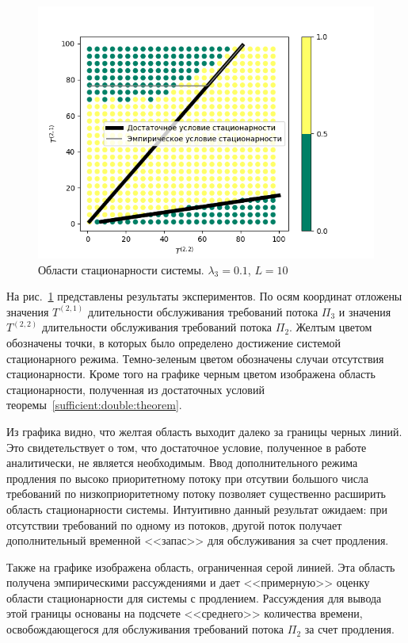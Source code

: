 \documentclass{report}
\begin{document}
\begin{figure}[h]
\centering
\includegraphics[scale=0.85]{0_1_thres_10_target_fact_.png} 
\caption{Области стационарности системы. $\lambda_3=0.1$, $L=10$}
\label{Experiment:stationar}
\end{figure}
На рис.~\ref{Experiment:stationar} представлены результаты экспериментов. По осям координат отложены значения $T^{(2,1)}$ длительности обслуживания требований потока $\Pi_3$ и значения $T^{(2,2)}$ длительности обслуживания требований потока $\Pi_2$. Желтым цветом обозначены точки, в которых было определено достижение системой стационарного режима. Темно-зеленым цветом обозначены случаи отсутствия стационарности. Кроме того на графике черным цветом изображена область стационарности, полученная из достаточных условий теоремы~\ref{sufficient:double:theorem}. 

Из графика видно, что желтая область выходит далеко за границы черных линий. Это свидетельствует о том, что достаточное условие, полученное в работе аналитически, не является необходимым. Ввод дополнительного режима продления по высоко приоритетному потоку при отсутвии большого числа требований по низкоприоритетному потоку позволяет существенно расширить область стационарности системы. Интуитивно данный результат ожидаем: при отсутствии требований по одному из потоков, другой поток получает дополнительный временной <<запас>> для обслуживания за счет продления.

Также на графике изображена область, ограниченная серой линией. Эта область получена эмпирическими рассуждениями и дает <<примерную>> оценку области стационарности для системы с продлением. Рассуждения для вывода этой границы основаны на подсчете <<среднего>> количества времени, освобождающегося для обслуживания требований потока $\Pi_2$ за счет продления.
\end{document}
